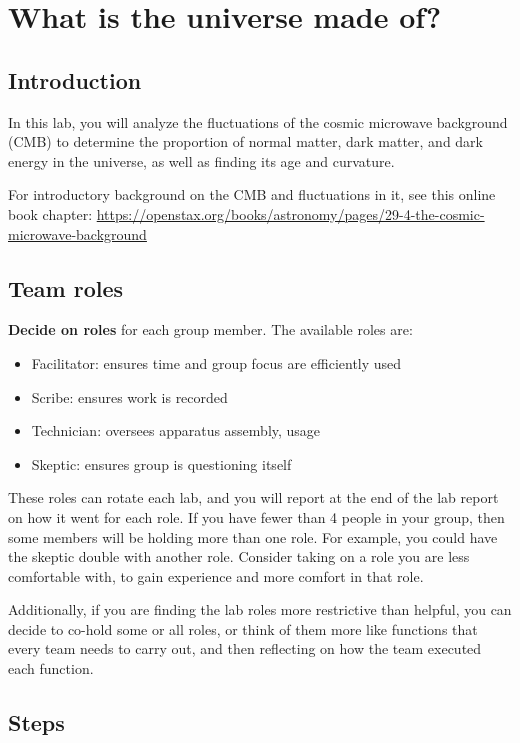 \chapter{What is the universe made of?}

\section{Introduction}

In this lab, you will analyze the fluctuations of the cosmic microwave background (CMB) to determine the proportion of normal matter, dark matter, and dark energy in the universe, as well as finding its age and curvature.

For introductory background on the CMB and fluctuations in it, see this online book chapter: \url{https://openstax.org/books/astronomy/pages/29-4-the-cosmic-microwave-background}

\section{Team roles}

\textbf{Decide on roles} for each group member. The available roles are:

\begin{itemize}
	\item Facilitator: ensures time and group focus are efficiently used
	\item Scribe: ensures work is recorded
	\item Technician: oversees apparatus assembly, usage
	\item Skeptic: ensures group is questioning itself
\end{itemize}

These roles can rotate each lab, and you will report at the end of the lab report on how it went for each role. If you have fewer than 4 people in your group, then some members will be holding more than one role. For example, you could have the skeptic double with another role. Consider taking on a role you are less comfortable with, to gain experience and more comfort in that role.

Additionally, if you are finding the lab roles more restrictive than helpful, you can decide to co-hold some or all roles, or think of them more like functions that every team needs to carry out, and then reflecting on how the team executed each function.

\section{Steps}


